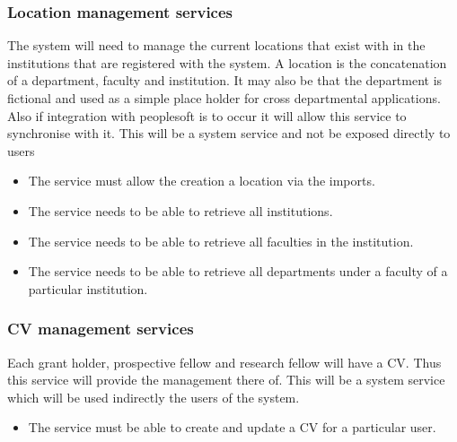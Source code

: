 \documentclass[12pt]{article}
\begin{document}
\subsubsection{Location management services}
	The system will need to manage the current locations that exist with in the institutions that are registered with the system. A location is the concatenation of a department, faculty and institution. It may also be that the department is fictional and used as a simple place holder for cross departmental applications. Also if integration with peoplesoft is to occur it will allow this service to synchronise with it. This will be a system service and not be exposed directly to users
	\begin{itemize}		
		\item The service must allow the creation a location via the imports.
		\item The service needs to be able to retrieve all institutions.
		\item The service needs to be able to retrieve all faculties in the institution.
		\item The service needs to be able to retrieve all departments under a faculty of a particular institution.
	\end{itemize}
\subsubsection{CV management services}
	Each grant holder, prospective fellow and research fellow will have a CV. Thus this service will provide the management there of. This will be a system service which will be used indirectly the users of the system. 
	\begin{itemize}		
		\item The service must be able to create and update a CV for a particular user.
	\end{itemize}
\vspace{0.2in}
\end{document}
